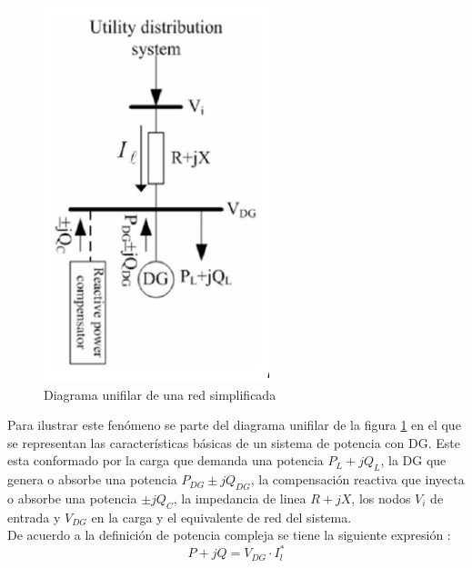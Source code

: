 \documentclass[12pt, letterpaper]{report}
\begin{document}
\begin{figure}
	\begin{center}
		\caption{Diagrama unifilar de una red simplificada}
		\label{fig:dos_nodos}
		\includegraphics[width=0.6\linewidth]{imagenes/cap_1/dos_nodos}
	\end{center}	
\end{figure}

Para ilustrar este fenómeno se parte  del diagrama unifilar de la figura \ref{fig:dos_nodos} en el que se representan las características básicas de un sistema de potencia con \ac{DG}. Este esta conformado por la carga que demanda una potencia $P_{L}+jQ_{L}$, la DG que genera o absorbe una potencia $P_{DG}\pm jQ_{DG}$,  la compensación reactiva que inyecta o absorbe una potencia $\pm jQ_{C}$, la impedancia de linea $R+jX$,  los nodos $V_{i} $ de entrada y $V_{DG}$ en la carga y el equivalente de red del sistema.\\

De acuerdo a la definición de potencia compleja se tiene la siguiente expresión \cite{Akagi2017}:\\

\begin{equation}
\label{equ:comp}
P + jQ = V_{DG} \cdot I_{l}^{*}
\end{equation}
\end{document}
